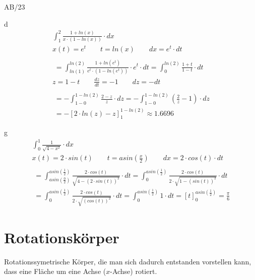 \begin{exercise}{AB/23}
  \item [d]
  \begin{gather*}
    \int_1^2 \frac{1 + ln(x)}{x \cdot (1 - ln(x))} \cdot dx \\
    x(t) = e^t \qquad t = ln(x) \qquad dx = e^t \cdot dt \\\\
    \;= \int_{ln(1)}^{ln(2)} \frac{1 + ln(e^t)}{e^t \cdot (1 - ln(e^t))} \cdot e^t \cdot dt = \int_0^{ln(2)} \frac{1 + t}{1 - t} \cdot dt \\
    z = 1 - t \qquad \frac{dz}{dt} = -1 \qquad dz = -dt \\\\
    \;= -\int_{1 - 0}^{1 - ln(2)} \frac{2 - z}{z} \cdot dz = -\int_{1 - 0}^{1 - ln(2)} (\frac{2}{z} - 1) \cdot dz \\
    \;= -\left[2 \cdot ln(z) - z\right]_1^{1 - ln(2)} \approx 1.6696
  \end{gather*}
  \item [g]
  \begin{gather*}
    \int_0^1 \frac{1}{\sqrt{4 - x^2}} \cdot dx \\
    x(t) = 2 \cdot sin(t) \qquad t = asin(\frac{x}{2}) \qquad dx = 2 \cdot cos(t) \cdot dt \\\\
    \;= \int_{asin(\frac{0}{2})}^{asin(\frac{1}{2})} \frac{2 \cdot cos(t)}{\sqrt{4 - (2 \cdot sin(t))^2}} \cdot dt = \int_0^{asin(\frac{1}{2})} \frac{2 \cdot cos(t)}{2 \cdot \sqrt{1 - (sin(t))^2}} \cdot dt \\
    \;= \int_0^{asin(\frac{1}{2})} \frac{2 \cdot cos(t)}{2 \cdot \sqrt{(cos(t))^2}} \cdot dt = \int_0^{asin(\frac{1}{2})} 1 \cdot dt = \left[t\right]_0^{asin(\frac{1}{2})} = \frac{\pi}{6}
  \end{gather*}
\end{exercise}
\section{Rotationskörper}
Rotationssymetrische Körper, die man sich dadurch entstanden vorstellen kann, dass eine Fläche um eine Achse ($x$-Achse) rotiert.
